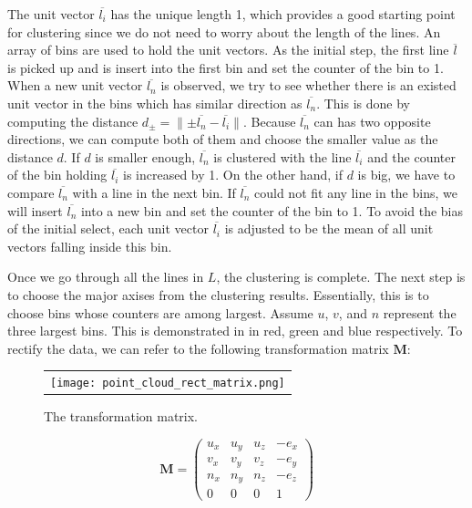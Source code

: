 The unit vector $\overline{l_i}$ has the unique length 1, which provides a good starting point 
for clustering since we do not need to worry about the length of the lines. 
An array of bins are used to hold the unit vectors.
As the initial step, the first line $\overline{l}$ is picked up and is insert into the 
first bin and set the counter of the bin to 1.
When a new unit vector $\overline{l_n}$ is observed, we try to see whether there is an
existed unit vector in the bins which has similar direction as $\overline{l_n}$. This is
done by computing the distance $d_{\pm}=\parallel \pm\overline{l_n} - \overline{l_i} \parallel$.
Because $\overline{l_n}$ can has two opposite directions, we can compute both of them and
choose the smaller value as the distance $d$. If $d$ is smaller enough, $\overline{l_n}$
is clustered with the line $\overline{l_i}$ and the counter of the bin holding $\overline{l_i}$
is increased by 1. On the other hand, if $d$ is big, we have to compare $\overline{l_n}$
with a line in the next bin. If $\overline{l_n}$ could not fit any line in the bins, we
will insert $\overline{l_n}$ into a new bin and set the counter of the bin to 1. 
To avoid the bias of the initial select, each unit vector $\overline{l_i}$ is
adjusted to be the mean of all unit vectors falling inside this bin. 

Once we go through all the lines in $L$, the clustering is complete. 
The next step is to choose the major axises from the clustering results. 
Essentially, this is to choose bins whose counters are among largest. 
Assume $u$, $v$, and $n$ represent the three largest bins. This is demonstrated in
 in red, green and blue respectively. To rectify the data,
we can refer to the following transformation matrix $\mathbf{M}$:
\begin{figure}[htbp]
\begin{center}
\begin{tabular}{c}
\texttt{[image: point\_cloud\_rect\_matrix.png]}
\end{tabular}
\end{center}
\caption{ The transformation matrix. }
\label{fig:pc_rect_matrix}
\end{figure}

\begin{equation*}
\mathbf{M} = \left(
\begin{array}{cccc}
u_x & u_y & u_z & -e_x \\
v_x & v_y & v_z & -e_y \\
n_x & n_y & n_z & -e_z \\
  0 &   0 &   0 &    1 
\end{array} \right)
\end{equation*}

